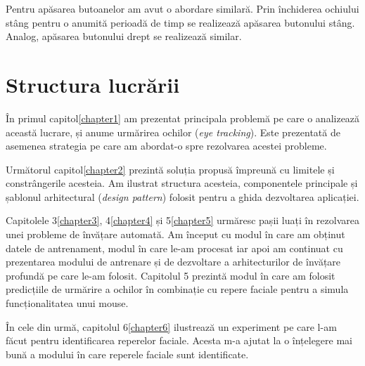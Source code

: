 Pentru apăsarea butoanelor am avut o abordare similară.
Prin închiderea ochiului stâng pentru o anumită perioadă de timp se realizează apăsarea butonului stâng.
Analog, apăsarea butonului drept se realizează similar.

\section*{Structura lucrării}
În primul capitol\ref{chapter1} am prezentat principala problemă pe care o analizează această lucrare, și anume urmărirea ochilor (\emph{eye tracking}).
Este prezentată de asemenea strategia pe care am abordat-o spre rezolvarea acestei probleme.

Următorul capitol\ref{chapter2} prezintă soluția propusă împreună cu limitele și constrângerile acesteia.
Am ilustrat structura acesteia, componentele principale și șablonul arhitectural (\emph{design pattern}) folosit pentru a ghida dezvoltarea aplicației.

Capitolele 3\ref{chapter3}, 4\ref{chapter4} și 5\ref{chapter5} urmăresc pașii luați în rezolvarea unei probleme de învățare automată.
Am început cu modul în care am obținut datele de antrenament, modul în care le-am procesat iar apoi am continuat cu prezentarea modului de antrenare și de dezvoltare a arhitecturilor de învățare profundă pe care le-am folosit.
Capitolul 5 prezintă modul în care am folosit predicțiile de urmărire a ochilor în combinație cu repere faciale pentru a simula funcționalitatea unui mouse.

În cele din urmă, capitolul 6\ref{chapter6} ilustrează un experiment pe care l-am făcut pentru identificarea reperelor faciale.
Acesta m-a ajutat la o înțelegere mai bună a modului în care reperele faciale sunt identificate.

